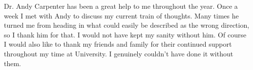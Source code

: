 Dr. Andy Carpenter has been a great help to me throughout the year. Once a week I met with Andy to discuss my current train of thoughts. Many times he turned me from heading in what could easily be described as the wrong direction, so I thank him for that. I would not have kept my sanity without him.
Of course I would also like to thank my friends and family for their continued support throughout my time at University. I genuinely couldn't have done it without them.